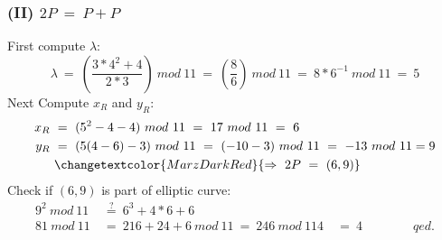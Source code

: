 \documentclass{report}
\begin{document}
			\subsubsection{(II) $2P \ = \ P + P$}
			\startsubsection
				First compute $\lambda$:
				\[
					\lambda \ = \ \left( \frac{3*4^2 + 4}{2*3} \right) \ mod \ 11 \ = \ \left( \frac{8}{6} \right) \ mod \ 11 \ = \ 8 * 6^{-1} \ mod \ 11 \ = \ 5
				\]
				Next Compute $x_R$ and $y_R$:
				\begin{align*}
					x_R \ & = \ (5^2 - 4 - 4) \ mod \ 11 \ = \ 17 \ mod \ 11 \ = \ 6 \\
					y_R \ & = \ (5(4 - 6) - 3) \ mod \ 11 \ = \ (-10 - 3) \ mod \ 11 \ = \ -13 \ mod \ 11 = 9 \\
					& \changetextcolor{MarzDarkRed}{\Rightarrow \ 2P \ = \ (6, 9)}
				\end{align*}
				Check if $(6,9)$ is part of elliptic curve:
				\begin{align*}
					9^2 \ mod \ 11 \ & \stackrel{?}{=} \ 6^3 + 4 * 6 + 6 \\
					81 \ mod \ 11 \ & = \ 216 + 24 + 6 \ mod \ 11 \ = \ 246 \ mod \ 11
					4 \ & = \ 4 \hspace{4em} qed.
				\end{align*}
			\closesection
\end{document}
